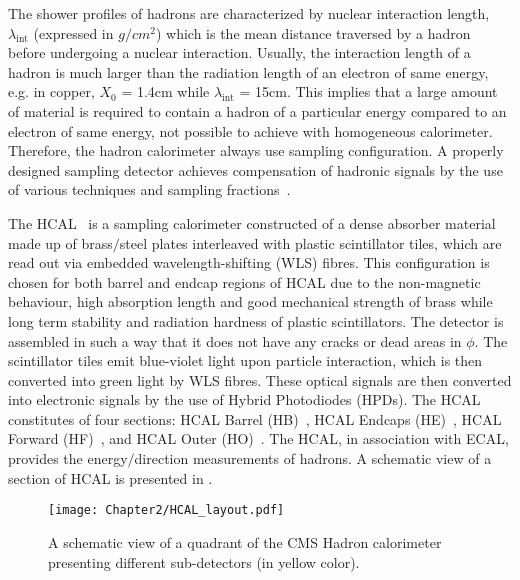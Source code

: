 The shower profiles of hadrons are characterized by nuclear interaction length, $\lambda_{\textrm{int}}$ (expressed in $\unit{g/{cm}^{2}}$)
which is the mean distance traversed by a hadron before undergoing a nuclear interaction. Usually, the interaction length of a hadron is much larger than
the radiation length of an electron of same energy, e.g. in copper, $X_{0}$ = 1.4\unit{cm} while $\lambda_{\textrm{int}}$ = 15\unit{cm}. 
This implies that a large amount of material is required to contain a hadron of a particular energy compared to an electron of same energy, not
possible to achieve with homogeneous calorimeter. Therefore, the hadron calorimeter always use sampling configuration. A properly designed sampling detector achieves
compensation of hadronic signals by the use of various techniques and sampling fractions~\cite{Wigmans:1991cc}.

The HCAL~\cite{hcalTDR} is a sampling calorimeter constructed of a dense absorber material made up of brass$/$steel plates interleaved with plastic scintillator tiles,
which are read out via embedded wavelength-shifting (WLS) fibres. This configuration is chosen for both barrel and endcap regions of HCAL
due to the non-magnetic behaviour, high absorption length and
good mechanical strength of brass while long term stability and radiation hardness of plastic scintillators. The detector is assembled in such a way that it
does not have any cracks or dead areas in $\phi$. The scintillator
tiles emit blue-violet light upon particle interaction, which is then converted into green light by WLS fibres. These optical signals are then converted into
electronic signals by the use of Hybrid Photodiodes (HPDs).
The HCAL constitutes of four sections: HCAL Barrel (HB)~\cite{Abdullin:2008zzb},
HCAL Endcaps (HE)~\cite{Baiatian:2008zz}, HCAL Forward (HF)~\cite{Bayatian:2006jz}, and HCAL Outer (HO)~\cite{Abdullin:2008zza}. The HCAL, in association
with ECAL, provides the energy$/$direction measurements of hadrons. A schematic view of a section
of HCAL is presented in \fig{\ref{fig:HCAL}}.

\begin{figure}[h]
\begin{center}
\texttt{[image: Chapter2/HCAL\_layout.pdf]}
\caption{A schematic view of a quadrant of the CMS Hadron calorimeter presenting different sub-detectors (in yellow color).}
\label{fig:HCAL}
\end{center}
\end{figure}
\vspace{-0.3in}

